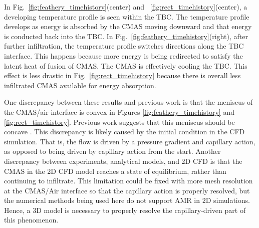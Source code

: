 \documentclass[%
 aip,
 amsmath,amssymb,
 reprint,%
]{revtex4-1}
\begin{document}
In Fig.~\ref{fig:feathery_timehistory}(center) and ~\ref{fig:rect_timehistory}(center), a developing temperature profile is seen within the TBC. The temperature profile develops as energy is absorbed by the CMAS moving downward and that energy is conducted back into the TBC. 
In Fig.~\ref{fig:feathery_timehistory}(right), after further infiltration, the temperature profile switches directions along the TBC interface.
This happens because more energy is being redirected to satisfy the latent heat of fusion of CMAS. The CMAS is effectively cooling the TBC.
This effect is less drastic in Fig.~\ref{fig:rect_timehistory} because there is overall less infiltrated CMAS available for energy absorption.

One discrepancy between these results and previous work is that the meniscus of the CMAS/air interface is convex in Figures \ref{fig:feathery_timehistory} and \ref{fig:rect_timehistory}. Previous work suggests that this meniscus should be concave \cite{Naraparaju2019}. This discrepancy is likely caused by the initial condition in the CFD simulation. That is, the flow is driven by a pressure gradient and capillary action, as opposed to being driven by capillary action from the start. Another discrepancy between experiments, analytical models, and 2D CFD is that the CMAS in the 2D CFD model reaches a state of equilibrium, rather than continuing to infiltrate. This limitation could be fixed with more mesh resolution at the CMAS/Air interface so that the capillary action is properly resolved, but the numerical methods being used here do not support AMR in 2D simulations. Hence, a 3D model is necessary to properly resolve the capillary-driven part of this phenomenon. 

\end{document}
